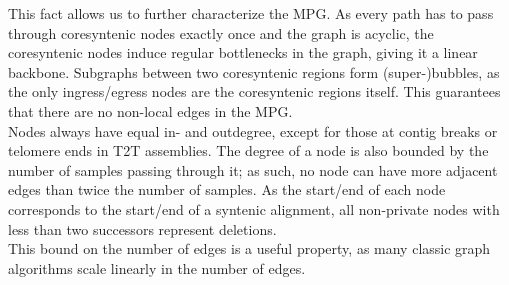%

This fact allows us to further characterize the MPG.
As every path has to pass through coresyntenic nodes exactly once and the graph is acyclic, the coresyntenic nodes induce regular bottlenecks in the graph, giving it a linear backbone.
Subgraphs between two coresyntenic regions form (super-)bubbles, as the only ingress/egress nodes are the coresyntenic regions itself.
This guarantees that there are no non-local edges in the MPG.\\
Nodes always have equal in- and outdegree, except for those at contig breaks or telomere ends in T2T assemblies.
The degree of a node is also bounded by the number of samples passing through it; as such, no node can have more adjacent edges than twice the number of samples.
As the start/end of each node corresponds to the start/end of a syntenic alignment, all non-private nodes with less than two successors represent deletions.\\
This bound on the number of edges is a useful property, as many classic graph algorithms scale linearly in the number of edges.

